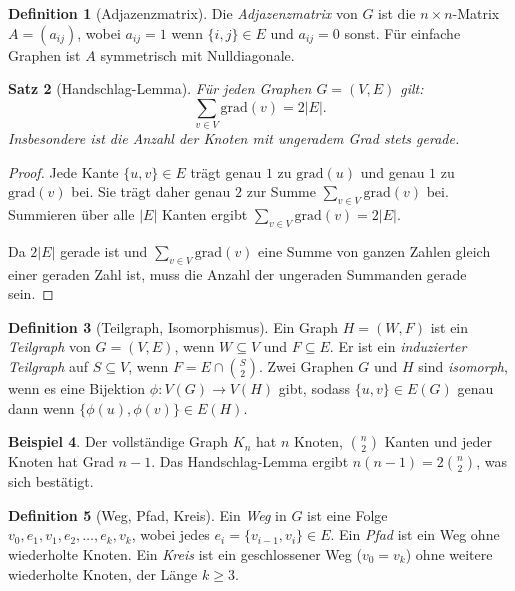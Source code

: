 \documentclass[12pt,a4paper]{amsart}
\newtheorem{theorem}{Satz}[section]
\theoremstyle{definition}
\newtheorem{definition}[theorem]{Definition}
\newtheorem{example}[theorem]{Beispiel}
\theoremstyle{remark}
\newcommand{\grad}{\mathrm{grad}}
\begin{document}
\begin{definition}[Adjazenzmatrix]
Die \emph{Adjazenzmatrix} von $G$ ist die $n \times n$-Matrix $A = (a_{ij})$,
wobei $a_{ij} = 1$ wenn $\{i,j\} \in E$ und $a_{ij} = 0$ sonst. Für einfache
Graphen ist $A$ symmetrisch mit Nulldiagonale.
\end{definition}

\begin{theorem}[Handschlag-Lemma]
\label{satz:handschlag}
Für jeden Graphen $G = (V, E)$ gilt:
\[
  \sum_{v \in V} \grad(v) = 2|E|.
\]
Insbesondere ist die Anzahl der Knoten mit ungeradem Grad stets gerade.
\end{theorem}

\begin{proof}
Jede Kante $\{u, v\} \in E$ trägt genau $1$ zu $\grad(u)$ und genau $1$ zu
$\grad(v)$ bei. Sie trägt daher genau $2$ zur Summe $\sum_{v \in V} \grad(v)$
bei. Summieren über alle $|E|$ Kanten ergibt $\sum_{v \in V} \grad(v) = 2|E|$.

Da $2|E|$ gerade ist und $\sum_{v \in V} \grad(v)$ eine Summe von ganzen Zahlen
gleich einer geraden Zahl ist, muss die Anzahl der ungeraden Summanden gerade
sein.
\end{proof}

\begin{definition}[Teilgraph, Isomorphismus]
Ein Graph $H = (W, F)$ ist ein \emph{Teilgraph} von $G = (V, E)$, wenn
$W \subseteq V$ und $F \subseteq E$. Er ist ein \emph{induzierter Teilgraph}
auf $S \subseteq V$, wenn $F = E \cap \binom{S}{2}$. Zwei Graphen $G$ und $H$
sind \emph{isomorph}, wenn es eine Bijektion $\phi: V(G) \to V(H)$ gibt,
sodass $\{u,v\} \in E(G)$ genau dann wenn $\{\phi(u), \phi(v)\} \in E(H)$.
\end{definition}

\begin{example}
Der vollständige Graph $K_n$ hat $n$ Knoten, $\binom{n}{2}$ Kanten und
jeder Knoten hat Grad $n-1$. Das Handschlag-Lemma ergibt
$n(n-1) = 2\binom{n}{2}$, was sich bestätigt.
\end{example}

\begin{definition}[Weg, Pfad, Kreis]
Ein \emph{Weg} in $G$ ist eine Folge $v_0, e_1, v_1, e_2, \ldots, e_k, v_k$,
wobei jedes $e_i = \{v_{i-1}, v_i\} \in E$. Ein \emph{Pfad} ist ein Weg ohne
wiederholte Knoten. Ein \emph{Kreis} ist ein geschlossener Weg ($v_0 = v_k$)
ohne weitere wiederholte Knoten, der Länge $k \ge 3$.
\end{definition}
\end{document}
